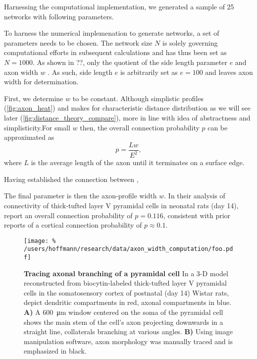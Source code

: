 Harnessing the computational implementation, we generated a sample of
25 networks with following parameters. 



To harness the numerical implemenation to generate networks, a set
of parameters needs to be chosen. The network size $N$ is solely
governing computational efforts in subsequent calculations and has
thus been set as $N = 1000$. As shown in ??, only the quotient of
the side length parameter $e$ and axon width $w$  . As such, side
length $e$ is arbitrarily set as $e = 100$ and leaves axon width for
determination. 

First, we determine $w$ to be constant. Although simplistic profiles
(\autoref{fig:axon_heat}) and makes for characteristic distance
distribution as we will see later
(\autoref{fig:distance_theory_compare}), more in line with idea of
abstractness and simplisticity.For small $w$ then, the overall
connection probability $p$ can be approximated as
\[
p = \frac{L w}{E^2},
\]
where $L$ is the average length of the axon until it terminates on a
surface edge. 


Having established the connection between , 


The final parameter is then the axon-profile width $w$. In their
analysis of connectivity of thick-tufted layer V pyramidal cells in
neonatal rats (day 14), \textcite{Song2005} report an overall connection
probability of $p=0.116$, consistent with prior reports of a cortical
connection probability of $p \approx 0.1$. %

\begin{figure}[!htbp]
  \centering
  \texttt{[image: \%
    /users/hoffmann/research/data/axon\_width\_computation/foo.pdf]}%
  \caption{\textbf{Tracing axonal branching of a pyramidal cell} In a
    3-D model reconstructed from biocytin-labeled thick-tufted layer V
    pyramidal cells in the somatosensory cortex of postnatal (day 14)
    Wistar rats, \textcite{Romand2011} depict dendritic compartments in
    red, axonal compartments in blue.  \textbf{A)} A
    \SI{600}{\micro\meter} window centered on the soma of the pyramidal
    cell shows the main stem of the cell's axon projecting downwards in a
    straight line, collaterals branching at various angles. \textbf{B)}
    Using image manipulation software, axon morphology was manually traced
    and is emphasized in black.} %
  \label{fig:determine_axon_width}%
\end{figure}


